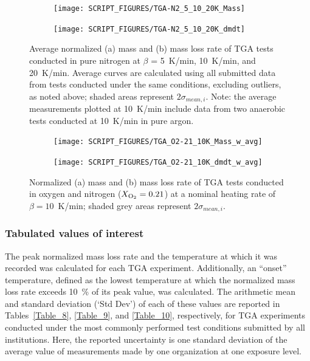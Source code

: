 \documentclass{book}
\begin{document}
\begin{figure}[p]
\centering
\begin{subfigure}[b]{0.85\textwidth}
   \texttt{[image: SCRIPT\_FIGURES/TGA-N2\_5\_10\_20K\_Mass]}
   \caption{}
   \label{Fig:TGA-N2_5_10_20K_Mass}
\end{subfigure}

\begin{subfigure}[b]{0.85\textwidth}
   \texttt{[image: SCRIPT\_FIGURES/TGA-N2\_5\_10\_20K\_dmdt]}
   \caption{}
   \label{Fig:TGA-N2_5_10_20K_dmdt}
\end{subfigure}

  \caption{Average normalized (a) mass and (b) mass loss rate of TGA tests conducted in pure nitrogen at $\beta$ = 5~K/min, 10~K/min, and 20~K/min. Average curves are calculated using all submitted data from tests conducted under the same conditions, excluding outliers, as noted above; shaded areas represent $2\sigma_{mean,i}$. Note: the average measurements plotted at 10~K/min include data from two anaerobic tests conducted at 10~K/min in pure argon.}
  \label{Fig:TGA-N2_5_10_20K}
\end{figure}


\begin{figure}[p]
\centering
\begin{subfigure}[b]{0.85\textwidth}
   \texttt{[image: SCRIPT\_FIGURES/TGA\_O2-21\_10K\_Mass\_w\_avg]}
   \caption{}
   \label{Fig:TGA_O2-21_10KMass_w_avg}
\end{subfigure}

\begin{subfigure}[b]{0.85\textwidth}
   \texttt{[image: SCRIPT\_FIGURES/TGA\_O2-21\_10K\_dmdt\_w\_avg]}
   \caption{}
   \label{Fig:TGA_O2-21_10Kdmdt_w_avg}
\end{subfigure}

  \caption{Normalized (a) mass and (b) mass loss rate of TGA tests conducted in oxygen and nitrogen ($X_{\rm O_2}=0.21$) at a nominal heating rate of $\beta=10$~K/min; shaded grey areas represent $2\sigma_{mean,i}$.}
  \label{Fig:TGA_O2-21_10K_w_avg}
\end{figure}

\newpage
\subsubsection{Tabulated values of interest}

The peak normalized mass loss rate and the temperature at which it was recorded was calculated for each TGA experiment. Additionally, an ``onset'' temperature, defined as the lowest temperature at which the normalized mass loss rate exceeds 10~\% of its peak value, was calculated. The arithmetic mean and standard deviation (`Std Dev') of each of these values are reported in Tables~\ref{Table_8}, \ref{Table_9}, and \ref{Table_10}, respectively, for TGA experiments conducted under the most commonly performed test conditions submitted by all institutions. Here, the reported uncertainty is one standard deviation of the average value of measurements made by one organization at one exposure level.
\end{document}
